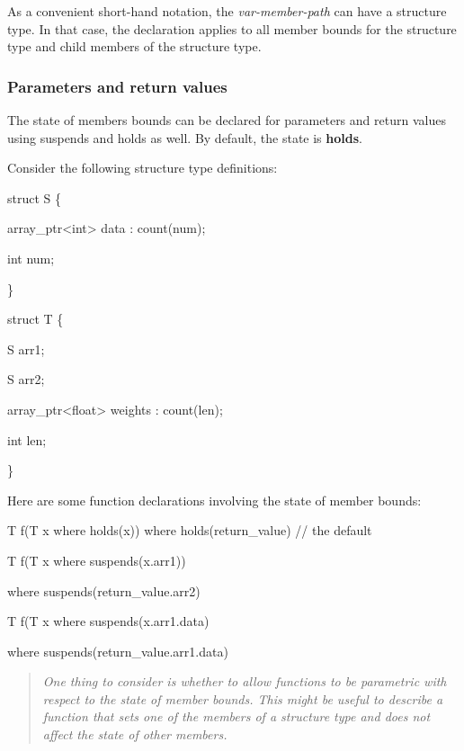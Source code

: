 \documentclass[]{article}
\begin{document}
As a convenient short-hand notation, the \emph{var-member-path} can have
a structure type. In that case, the declaration applies to all member
bounds for the structure type and child members of the structure type.

\subsubsection{\texorpdfstring{\protect\hypertarget{ux5fToc420589201}{}{\protect\hypertarget{ux5fToc422906992}{}{\protect\hypertarget{ux5fToc424307707}{}{\protect\hypertarget{ux5fToc426641097}{}{\protect\hypertarget{ux5fToc435434978}{}{\protect\hypertarget{ux5fToc437460809}{}{\protect\hypertarget{ux5fToc440445490}{}{\protect\hypertarget{ux5fToc440449272}{}{\protect\hypertarget{ux5fToc440551922}{}{}}}}}}}}}Parameters
and return
values}{Parameters and return values}}\label{parameters-and-return-values}

The state of members bounds can be declared for parameters and return
values using suspends and holds as well. By default, the state is
\textbf{holds}.

Consider the following structure type definitions:

struct S \{

array\_ptr\textless{}int\textgreater{} data : count(num);

int num;

\}

struct T \{

S arr1;

S arr2;

array\_ptr\textless{}float\textgreater{} weights : count(len);

int len;

\}

Here are some function declarations involving the state of member
bounds:

T f(T x where holds(x)) where holds(return\_value) // the default

T f(T x where suspends(x.arr1))

where suspends(return\_value.arr2)

T f(T x where suspends(x.arr1.data)

where suspends(return\_value.arr1.data)

\begin{quote}
\emph{One thing to consider is whether to allow functions to be
parametric with respect to the state of member bounds. This might be
useful to describe a function that sets one of the members of a
structure type and does not affect the state of other members.}
\end{quote}
\end{document}
